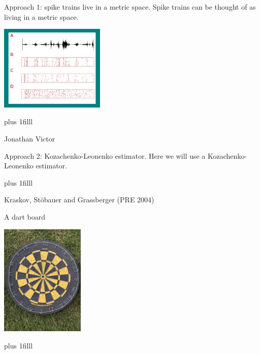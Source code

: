\documentclass{beamer}
\newcommand{\btVFill}{\vskip0pt plus 1filll}
\begin{document}
\begin{frame}{Approach 1: spike trains live in a metric space.}
\vskip 1cm  
Spike trains can be thought of as living in a metric space.
\vskip 1cm
\color{reddish}
\begin{center}
\includegraphics[width=5cm]{SpikeTrains.png}
\end{center}

  \btVFill
  \begin{flushright}
    \color{gray}
    \tiny{Jonathan Victor}
    \color{black}
\end{flushright}
\end{frame}


\begin{frame}{Approach 2: Kozachenko-Leonenko estimator.}
\vskip 3cm
  Here we will use a Kozachenko-Leonenko estimator.

  \btVFill
  \begin{flushright}
    \color{gray}
    \tiny{Kraskov, St\"{o}bauer and Grassberger (PRE 2004)}
    \color{black}
\end{flushright}
\end{frame}


\begin{frame}{A dart board}
\color{reddish}
\begin{center}
\includegraphics[width=4cm]{dart_board.jpg}
\end{center}
\color{black}
\btVFill
\color{gray}
\color{black}
\end{frame}
\end{document}
